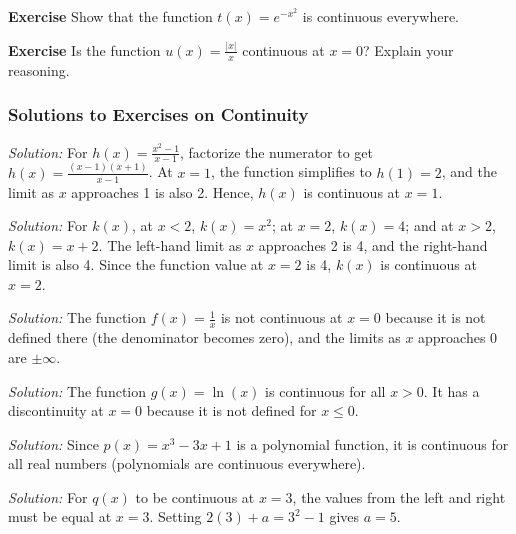 \documentclass[a4paper,12pt]{book}
\newenvironment{exercise}[1][]
  {\par\medskip\noindent\textbf{Exercise #1} \rmfamily}
  {\medskip}
\newenvironment{solution}[1][]
{\par\noindent\textit{Solution:} \rmfamily}{\medskip}
\begin{document}
\begin{exercise}
Show that the function \( t(x) = e^{-x^2} \) is continuous everywhere.
\end{exercise}

\begin{exercise}
Is the function \( u(x) = \frac{|x|}{x} \) continuous at \( x = 0 \)? Explain your reasoning.
\end{exercise}

\subsubsection*{Solutions to Exercises on Continuity}

\begin{solution}[1]
For \( h(x) = \frac{x^2 - 1}{x - 1} \), factorize the numerator to get \( h(x) = \frac{(x - 1)(x + 1)}{x - 1} \). At \( x = 1 \), the function simplifies to \( h(1) = 2 \), and the limit as \( x \) approaches 1 is also 2. Hence, \( h(x) \) is continuous at \( x = 1 \).
\end{solution}

\begin{solution}[2]
For \( k(x) \), at \( x < 2 \), \( k(x) = x^2 \); at \( x = 2 \), \( k(x) = 4 \); and at \( x > 2 \), \( k(x) = x + 2 \). The left-hand limit as \( x \) approaches 2 is 4, and the right-hand limit is also 4. Since the function value at \( x = 2 \) is 4, \( k(x) \) is continuous at \( x = 2 \).
\end{solution}

\begin{solution}[3]
The function \( f(x) = \frac{1}{x} \) is not continuous at \( x = 0 \) because it is not defined there (the denominator becomes zero), and the limits as \( x \) approaches 0 are \( \pm \infty \).
\end{solution}

\begin{solution}[4]
The function \( g(x) = \ln(x) \) is continuous for all \( x > 0 \). It has a discontinuity at \( x = 0 \) because it is not defined for \( x \leq 0 \).
\end{solution}

\begin{solution}[5]
Since \( p(x) = x^3 - 3x + 1 \) is a polynomial function, it is continuous for all real numbers (polynomials are continuous everywhere).
\end{solution}

\begin{solution}[6]
For \( q(x) \) to be continuous at \( x = 3 \), the values from the left and right must be equal at \( x = 3 \). Setting \( 2(3) + a = 3^2 - 1 \) gives \( a = 5 \).
\end{solution}
\end{document}
